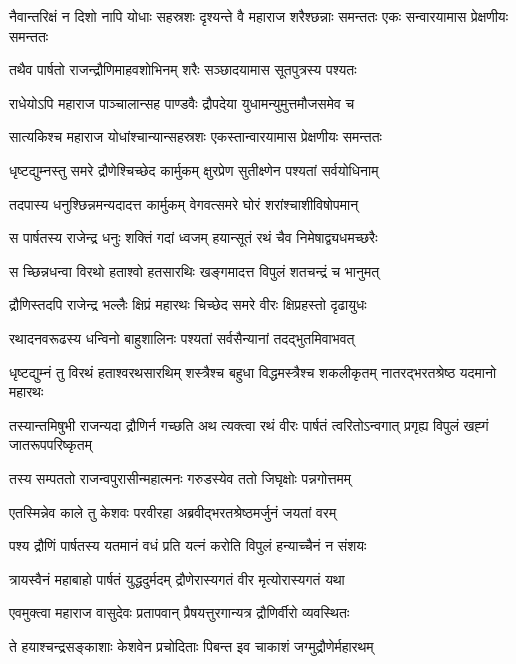 \threelineshloka
{नैवान्तरिक्षं न दिशो नापि योधाः सहस्रशः}
{दृश्यन्ते वै महाराज शरैश्छन्नाः समन्ततः}
{एकः सन्वारयामास प्रेक्षणीयः समन्ततः}


\twolineshloka
{तथैव पार्षतो राजन्द्रौणिमाहवशोभिनम्}
{शरैः सञ्छादयामास सूतपुत्रस्य पश्यतः}


\twolineshloka
{राधेयोऽपि महाराज पाञ्चालान्सह पाण्डवैः}
{द्रौपदेया युधामन्युमुत्तमौजसमेव च}


\twolineshloka
{सात्यकिश्च महाराज योधांश्चान्यान्सहस्रशः}
{एकस्तान्वारयामास प्रेक्षणीयः समन्ततः}


\twolineshloka
{धृष्टद्युम्नस्तु समरे द्रौणेश्चिच्छेद कार्मुकम्}
{क्षुरप्रेण सुतीक्ष्णेन पश्यतां सर्वयोधिनाम्}


\twolineshloka
{तदपास्य धनुश्छिन्नमन्यदादत्त कार्मुकम्}
{वेगवत्समरे घोरं शरांश्चाशीविषोपमान्}


\twolineshloka
{स पार्षतस्य राजेन्द्र धनुः शक्तिं गदां ध्वजम्}
{हयान्सूतं रथं चैव निमेषाद्व्यधमच्छरैः}


\twolineshloka
{स च्छिन्नधन्वा विरथो हताश्वो हतसारथिः}
{खङ्गमादत्त विपुलं शतचन्द्रं च भानुमत्}


\twolineshloka
{द्रौणिस्तदपि राजेन्द्र भल्लैः क्षिप्रं महारथः}
{चिच्छेद समरे वीरः क्षिप्रहस्तो दृढायुधः}


\twolineshloka
{रथादनवरूढस्य धन्विनो बाहुशालिनः}
{पश्यतां सर्वसैन्यानां तदद्भुतमिवाभवत्}


\threelineshloka
{धृष्टद्युम्नं तु विरथं हताश्वरथसारथिम्}
{शस्त्रैश्च बहुधा विद्धमस्त्रैश्च शकलीकृतम्}
{नातरद्भरतश्रेष्ठ यदमानो महारथः}


\threelineshloka
{तस्यान्तमिषुभी राजन्यदा द्रौणिर्न गच्छति}
{अथ त्यक्त्वा रथं वीरः पार्षतं त्वरितोऽन्वगात्}
{प्रगृह्य विपुलं खह्गं जातरूपपरिष्कृतम्}


\twolineshloka
{तस्य सम्पततो राजन्वपुरासीन्महात्मनः}
{गरुडस्येव ततो जिघृक्षोः पन्नगोत्तमम्}


\twolineshloka
{एतस्मिन्नेव काले तु केशवः परवीरहा}
{अब्रवीद्भरतश्रेष्ठमर्जुनं जयतां वरम्}


\twolineshloka
{पश्य द्रौणिं पार्षतस्य यतमानं वधं प्रति}
{यत्नं करोति विपुलं हन्याच्चैनं न संशयः}


\twolineshloka
{त्रायस्वैनं महाबाहो पार्षतं युद्धदुर्मदम्}
{द्रौणेरास्यगतं वीर मृत्योरास्यगतं यथा}


\twolineshloka
{एवमुक्त्वा महाराज वासुदेवः प्रतापवान्}
{प्रैषयत्तुरगान्यत्र द्रौणिर्वीरो व्यवस्थितः}


\twolineshloka
{ते हयाश्चन्द्रसङ्काशाः केशवेन प्रचोदिताः}
{पिबन्त इव चाकाशं जग्मुद्रौणेर्महारथम्}


